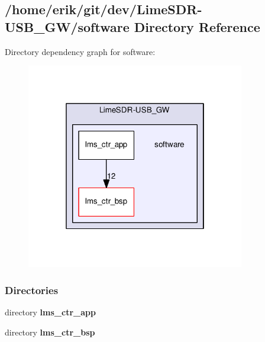 \subsection{/home/erik/git/dev/\+Lime\+S\+D\+R-\/\+U\+S\+B\+\_\+\+G\+W/software Directory Reference}
\label{dir_e302bf555e067f4f3711a625cd66ad13}
Directory dependency graph for software\+:
\nopagebreak
\begin{figure}[H]
\begin{center}
\leavevmode
\includegraphics[width=270pt]{dir_e302bf555e067f4f3711a625cd66ad13_dep}
\end{center}
\end{figure}
\subsubsection*{Directories}
\begin{DoxyCompactItemize}
\item 
directory {\bf lms\+\_\+ctr\+\_\+app}
\item 
directory {\bf lms\+\_\+ctr\+\_\+bsp}
\end{DoxyCompactItemize}
